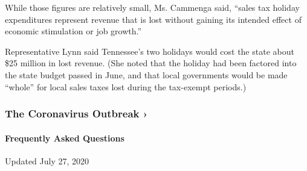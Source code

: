While those figures are relatively small, Ms. Cammenga said, ``sales tax
holiday expenditures represent revenue that is lost without gaining its
intended effect of economic stimulation or job growth.''

Representative Lynn said Tennessee's two holidays would cost the state
about \$25 million in lost revenue. (She noted that the holiday had been
factored into the state budget passed in June, and that local
governments would be made ``whole'' for local sales taxes lost during
the tax-exempt periods.)

\href{https://www.nytimes3xbfgragh.onion/news-event/coronavirus?action=click\&pgtype=Article\&state=default\&region=MAIN_CONTENT_3\&context=storylines_faq}{}

\hypertarget{the-coronavirus-outbreak-}{%
\subsubsection{The Coronavirus Outbreak
›}\label{the-coronavirus-outbreak-}}

\hypertarget{frequently-asked-questions}{%
\paragraph{Frequently Asked
Questions}\label{frequently-asked-questions}}

Updated July 27, 2020


